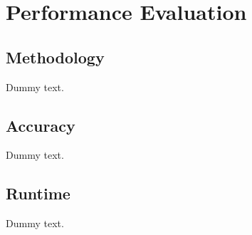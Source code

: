 \chapter{Performance Evaluation}

\section{Methodology}

Dummy text.

\section{Accuracy}

Dummy text.

\section{Runtime}

Dummy text.